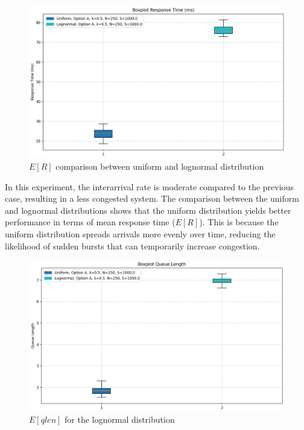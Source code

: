 \documentclass{report}
\begin{document}
\begin{figure}[H] 
    \centering 
    \includegraphics[width=\textwidth]{img/plots/I-vary/R_Box_A_I05.png} \caption{$E[R]$ comparison between uniform and lognormal distribution}
\end{figure}

In this experiment, the interarrival rate is moderate compared to the previous case, resulting in a less congested system.
The comparison between the uniform and lognormal distributions shows that the uniform distribution yields better performance in terms of mean response time ($E[R]$).
This is because the uniform distribution spreads arrivals more evenly over time, reducing the likelihood of sudden bursts that can temporarily increase congestion.

\begin{figure}[H] 
    \centering 
    \includegraphics[width=\textwidth]{img/plots/I-vary/Q_Box_A_I05.png} \caption{$E[qlen]$ for the lognormal distribution} 
\end{figure}
\end{document}
